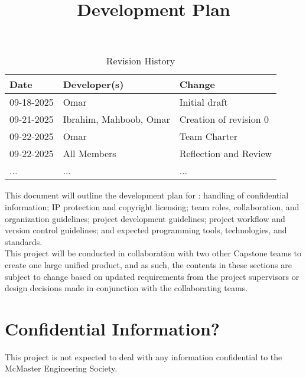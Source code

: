 \documentclass{article}
\title{Development Plan\\\progname}
\author{\authname}
\date{}
\begin{document}
\maketitle
\begin{table}[hp]
\caption{Revision History} \label{TblRevisionHistory}
\begin{tabularx}{\textwidth}{llX}
\toprule
\textbf{Date} & \textbf{Developer(s)} & \textbf{Change}\\
\midrule
09-18-2025 & Omar & Initial draft\\
09-21-2025 & Ibrahim, Mahboob, Omar & Creation of revision 0\\
09-22-2025 & Omar & Team Charter\\
09-22-2025 & All Members & Reflection and Review\\
... & ... & ...\\
\bottomrule
\end{tabularx}
\end{table}

\newpage{}

This document will outline the development plan for \textbf{\teamname}:
handling of confidential information; IP protection and copyright licensing;
team roles, collaboration, and organization guidelines; project development
guidelines; project workflow and version control guidelines; and expected
programming tools, technologies, and standards.\\

This project will be conducted in collaboration with two other Capstone teams
to create one large unified product, and as such, the contents in these
sections are subject to change based on updated requirements from the project
supervisors or design decisions made in conjunction with the collaborating
teams.

\begin{comment}
\wss{Additional information on the development plan can be found in the
\href{https://gitlab.cas.mcmaster.ca/courses/capstone/-/blob/main/Lectures/L02b_POCAndDevPlan/POCAndDevPlan.pdf?ref_type=heads}
{lecture slides}.}
\end{comment}

\section{Confidential Information?}
\begin{flushleft}
This project is not expected to deal with any information confidential to the McMaster Engineering Society.
\end{flushleft}
\end{document}
